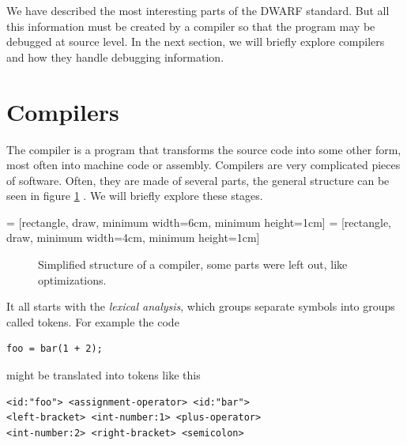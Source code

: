 We have described the most interesting parts of the DWARF standard. But all
this information must be created by a compiler so that the program
may be debugged at source level. In the next section, we will briefly explore
compilers and how they handle debugging information.

\section{Compilers}
The compiler is a program that transforms the source code into some other form,
most often into machine code or assembly. Compilers are very complicated pieces
of software. Often, they are made of several parts, the general structure can
be seen in figure \ref{fig:compiler-structure} \cite{dragon-book}. We will
briefly explore these stages.

 = [rectangle, draw, minimum width=6cm, minimum height=1cm] 
 = [rectangle, draw, minimum width=4cm, minimum height=1cm] 
\begin{figure}
    {\centering
    \par}
    \caption{Simplified structure of a compiler, some parts were left out, like
    optimizations.}
    \label{fig:compiler-structure}
\end{figure}

It all starts with the \textit{lexical analysis}, which groups separate symbols
into groups called tokens. For example the code
\begin{verbatim}
foo = bar(1 + 2);
\end{verbatim}
might be translated into tokens like this
\begin{lstlisting}[stringstyle=\color{black}]
<id:"foo"> <assignment-operator> <id:"bar"> 
<left-bracket> <int-number:1> <plus-operator> 
<int-number:2> <right-bracket> <semicolon>
\end{lstlisting}

